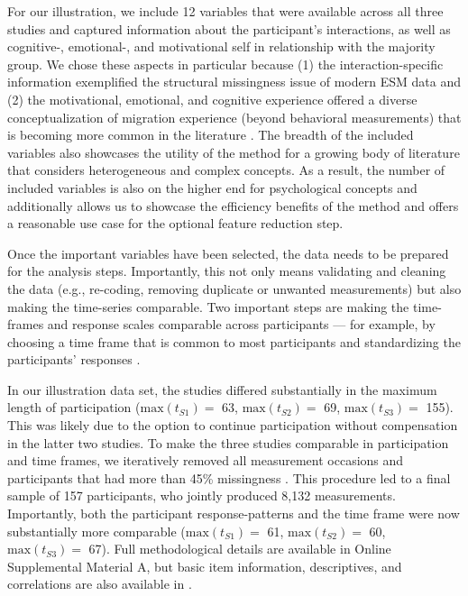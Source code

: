 For our illustration, we include 12 variables that were available across
all three studies and captured information about the participant's
interactions, as well as cognitive-, emotional-, and motivational self
in relationship with the majority group. We chose these aspects in
particular because (1) the interaction-specific information exemplified
the structural missingness issue of modern ESM data and (2) the
motivational, emotional, and cognitive experience offered a diverse
conceptualization of migration experience (beyond behavioral
measurements) that is becoming more common in the literature
\citep[][]{Kreienkamp2022d}. The breadth of the included variables also
showcases the utility of the method for a growing body of literature
that considers heterogeneous and complex concepts. As a result, the
number of included variables is also on the higher end for psychological
concepts and additionally allows us to showcase the efficiency benefits
of the method and offers a reasonable use case for the optional feature
reduction step.

Once the important variables have been selected, the data needs to be
prepared for the analysis steps. Importantly, this not only means
validating and cleaning the data (e.g., re-coding, removing duplicate or
unwanted measurements) but also making the time-series comparable. Two
important steps are making the time-frames and response scales
comparable across participants --- for example, by choosing a time frame
that is common to most participants and standardizing the participants'
responses
\citep['data exclusion' and 'data transformation' in ; also see][]{liao2005}.

In our illustration data set, the studies differed substantially in the
maximum length of participation (\(\text{max}(t_{S1})=\) 63,
\(\text{max}(t_{S2})=\) 69, \(\text{max}(t_{S3})=\) 155). This was
likely due to the option to continue participation without compensation
in the latter two studies. To make the three studies comparable in
participation and time frames, we iteratively removed all measurement
occasions and participants that had more than 45\% missingness
\citep[which was in line with the general recommendation for data that might still need to rely on imputations for later model testing][]{Madley-Dowd2019}.
This procedure led to a final sample of 157 participants, who jointly
produced 8,132 measurements. Importantly, both the participant
response-patterns and the time frame were now substantially more
comparable (\(\text{max}(t_{S1})=\) 61, \(\text{max}(t_{S2})=\) 60,
\(\text{max}(t_{S3})=\) 67). Full methodological details are available
in Online Supplemental Material A, but basic item information,
descriptives, and correlations are also available in
.


